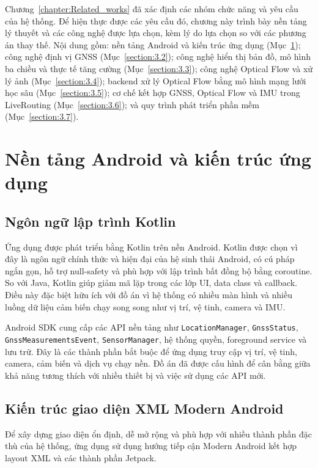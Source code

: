 \documentclass[../DoAn.tex]{subfiles}
\begin{document}
Chương~\ref{chapter:Related_works} đã xác định các nhóm chức năng và yêu cầu của hệ thống. Để hiện thực được các yêu cầu đó, chương này trình bày nền tảng lý thuyết và các công nghệ được lựa chọn, kèm lý do lựa chọn so với các phương án thay thế. Nội dung gồm: nền tảng Android và kiến trúc ứng dụng (Mục~\ref{section:3.1}); công nghệ định vị GNSS (Mục~\ref{section:3.2}); công nghệ hiển thị bản đồ, mô hình ba chiều và thực tế tăng cường (Mục~\ref{section:3.3}); công nghệ Optical Flow và xử lý ảnh (Mục~\ref{section:3.4}); backend xử lý Optical Flow bằng mô hình mạng lưới học sâu (Mục~\ref{section:3.5}); cơ chế kết hợp GNSS, Optical Flow và IMU trong LiveRouting (Mục~\ref{section:3.6}); và quy trình phát triển phần mềm (Mục~\ref{section:3.7}).

\section{Nền tảng Android và kiến trúc ứng dụng}
\label{section:3.1}
\subsection{Ngôn ngữ lập trình Kotlin}
\label{subsection:3.1.1}
Ứng dụng được phát triển bằng Kotlin trên nền Android. Kotlin được chọn vì đây là ngôn ngữ chính thức và hiện đại của hệ sinh thái Android, có cú pháp ngắn gọn, hỗ trợ null-safety và phù hợp với lập trình bất đồng bộ bằng coroutine. So với Java, Kotlin giúp giảm mã lặp trong các lớp UI, data class và callback. Điều này đặc biệt hữu ích với đồ án vì hệ thống có nhiều màn hình và nhiều luồng dữ liệu cảm biến chạy song song như vị trí, vệ tinh, camera và IMU.

Android SDK cung cấp các API nền tảng như \texttt{LocationManager}, \texttt{GnssStatus}, \texttt{GnssMeasurementsEvent}, \texttt{SensorManager}, hệ thống quyền, foreground service và lưu trữ. Đây là các thành phần bắt buộc để ứng dụng truy cập vị trí, vệ tinh, camera, cảm biến và dịch vụ chạy nền. Đồ án đã được cấu hình để cân bằng giữa khả năng tương thích với nhiều thiết bị và việc sử dụng các API mới.

\subsection{Kiến trúc giao diện XML Modern Android}
\label{subsection:3.1.2}
Để xây dựng giao diện ổn định, dễ mở rộng và phù hợp với nhiều thành phần đặc thù của hệ thống, ứng dụng sử dụng hướng tiếp cận Modern Android kết hợp layout XML và các thành phần Jetpack.
\end{document}
